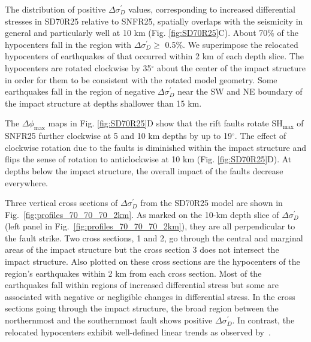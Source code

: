 \documentclass[draft]{agujournal2018}
\begin{document}
The distribution of positive $\Delta\sigma_{D}^{\prime}$ values, corresponding to increased differential stresses in SD70R25 relative to SNFR25, spatially overlaps with the seismicity in general and particularly well at 10 km (Fig. \ref{fig:SD70R25}C). About 70\% of the hypocenters fall in the region with $\Delta\sigma_{D}^{\prime} \ge$ 0.5\%. We superimpose the relocated hypocenters of earthquakes of \citet{Powell_2017} that occurred within 2 km of each depth slice. The hypocenters are rotated clockwise by 35$^{\circ}$ about the center of the impact structure in order for them to be consistent with the rotated model geometry. Some earthquakes fall in the region of negative $\Delta\sigma_{D}^{\prime}$ near the SW and NE boundary of the impact structure at depths shallower than 15 km.

The $\Delta\phi_{\max}$ maps in Fig. \ref{fig:SD70R25}D show that the rift faults rotate SH$_{\max}$ of SNFR25 further clockwise at 5 and 10 km depths by up to 19$^{\circ}$. The effect of clockwise rotation due to the faults is diminished within the impact structure and flips the sense of rotation to anticlockwise at 10 km (Fig. \ref{fig:SD70R25}D). At depths below the impact structure, the overall impact of the faults decrease everywhere.

Three vertical cross sections of $\Delta\sigma_{D}^{\prime}$ from the SD70R25 model are shown in Fig.~\ref{fig:profiles_70_70_70_2km}. As marked on the 10-km depth slice of $\Delta\sigma_{D}^{\prime}$ (left panel in Fig.~\ref{fig:profiles_70_70_70_2km}), they are all perpendicular to the fault strike. Two cross sections, 1 and 2, go through the central and marginal areas of the impact structure but the cross section 3 does not intersect the impact structure. Also plotted on these cross sections are the hypocenters of the region's earthquakes within 2 km from each cross section. Most of the earthquakes fall within regions of increased differential stress but some are associated with negative or negligible changes in differential stress. In the cross sections going through the impact structure, the broad region between the northernmost and the southernmost fault shows positive $\Delta\sigma_{D}^{\prime}$. In contrast, the relocated hypocenters exhibit well-defined linear trends as observed by~\citet{Powell_2017}.
\end{document}

